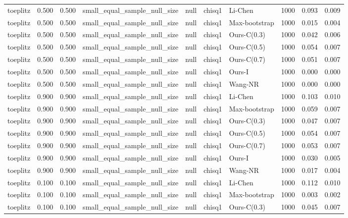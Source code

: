 \begin{tabular}{lrrllllrrr}
toeplitz & 0.500 & 0.500 & small\_equal\_sample\_null\_size & null & chisq1 & Li-Chen & 1000 & 0.093 & 0.009 \\
toeplitz & 0.500 & 0.500 & small\_equal\_sample\_null\_size & null & chisq1 & Max-bootstrap & 1000 & 0.015 & 0.004 \\
toeplitz & 0.500 & 0.500 & small\_equal\_sample\_null\_size & null & chisq1 & Ours-C(0.3) & 1000 & 0.042 & 0.006 \\
toeplitz & 0.500 & 0.500 & small\_equal\_sample\_null\_size & null & chisq1 & Ours-C(0.5) & 1000 & 0.054 & 0.007 \\
toeplitz & 0.500 & 0.500 & small\_equal\_sample\_null\_size & null & chisq1 & Ours-C(0.7) & 1000 & 0.051 & 0.007 \\
toeplitz & 0.500 & 0.500 & small\_equal\_sample\_null\_size & null & chisq1 & Ours-I & 1000 & 0.000 & 0.000 \\
toeplitz & 0.500 & 0.500 & small\_equal\_sample\_null\_size & null & chisq1 & Wang-NR & 1000 & 0.000 & 0.000 \\
toeplitz & 0.900 & 0.900 & small\_equal\_sample\_null\_size & null & chisq1 & Li-Chen & 1000 & 0.103 & 0.010 \\
toeplitz & 0.900 & 0.900 & small\_equal\_sample\_null\_size & null & chisq1 & Max-bootstrap & 1000 & 0.059 & 0.007 \\
toeplitz & 0.900 & 0.900 & small\_equal\_sample\_null\_size & null & chisq1 & Ours-C(0.3) & 1000 & 0.047 & 0.007 \\
toeplitz & 0.900 & 0.900 & small\_equal\_sample\_null\_size & null & chisq1 & Ours-C(0.5) & 1000 & 0.054 & 0.007 \\
toeplitz & 0.900 & 0.900 & small\_equal\_sample\_null\_size & null & chisq1 & Ours-C(0.7) & 1000 & 0.053 & 0.007 \\
toeplitz & 0.900 & 0.900 & small\_equal\_sample\_null\_size & null & chisq1 & Ours-I & 1000 & 0.030 & 0.005 \\
toeplitz & 0.900 & 0.900 & small\_equal\_sample\_null\_size & null & chisq1 & Wang-NR & 1000 & 0.017 & 0.004 \\
toeplitz & 0.100 & 0.100 & small\_equal\_sample\_null\_size & null & chisq1 & Li-Chen & 1000 & 0.112 & 0.010 \\
toeplitz & 0.100 & 0.100 & small\_equal\_sample\_null\_size & null & chisq1 & Max-bootstrap & 1000 & 0.003 & 0.002 \\
toeplitz & 0.100 & 0.100 & small\_equal\_sample\_null\_size & null & chisq1 & Ours-C(0.3) & 1000 & 0.045 & 0.007 \\

\end{tabular}
